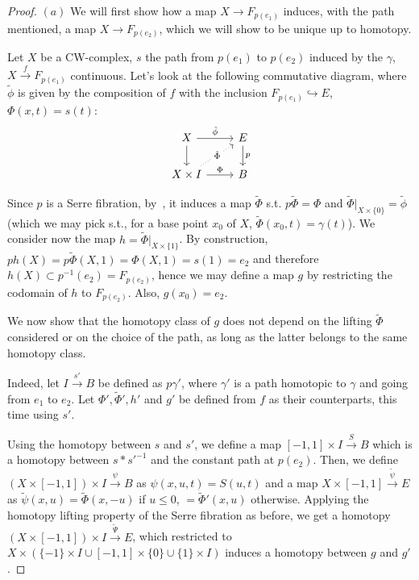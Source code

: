 \documentclass{article}
\begin{document}
\begin{proof}
    $(a)$ We will first show how a map $X\rightarrow F_{p(e_1)}$ induces, with
    the path mentioned, a map $X\rightarrow F_{p(e_2)}$, which we will show to
    be unique up to homotopy.

    Let $X$ be a CW-complex, $s$ the path from $p(e_1)$ to $p(e_2)$ induced
    by the $\gamma$, $X\xrightarrow{f} F_{p(e_1)}$ continuous. Let's look at the
    following commutative diagram, where $\tilde{\phi}$ is given by the
    composition of $f$ with the inclusion $F_{p(e_1)}\hookrightarrow E$, 
    $\Phi(x,t)=s(t)$:
    \[
        \begin{tikzcd}
            X\arrow{r}{\tilde{\phi}}\arrow{d}
            & E\arrow{d}{p} \\
            X\times I\arrow[dotted]{ur}[description]{\tilde{\Phi}}\arrow{r}{\Phi}
            & B
        \end{tikzcd}
    \]

    Since $p$ is a Serre fibration, by~\cite[p. 107, p.110]{FF16}, it induces a
    map $\tilde{\Phi}$ s.t. $p\tilde{\Phi}=\Phi$ and
    $\tilde{\Phi}|_{X\times\{0\}}=\tilde{\phi}$ (which we may pick s.t., for a
    base point $x_0$ of $X$, $\tilde{\Phi}(x_0,t)=\gamma(t)$). We consider now
    the map $h=\tilde{\Phi}|_{X\times\{1\}}$. By construction,
    $ph(X)=p\tilde{\Phi}(X,1)=\Phi(X,1)=s(1)=e_2$ and therefore $h(X)\subset
    p^{-1}(e_2)=F_{p(e_2)}$, hence we may define a map $g$ by restricting the
    codomain of $h$ to $F_{p(e_2)}$. Also, $g(x_0)=e_2$.

    We now show that the homotopy class of $g$ does not depend on the lifting
    $\tilde{\Phi}$ considered or on the choice of the path, as long as the
    latter belongs to the same homotopy class.

    Indeed, let $I\xrightarrow{s'}B$ be defined as $p\gamma'$, where $\gamma'$
    is a path homotopic to $\gamma$ and going from $e_1$ to $e_2$. Let $\Phi',
    \tilde{\Phi}',h'$ and $g'$ be defined from $f$ as their counterparts, this
    time using $s'$.

    Using the homotopy between $s$ and $s'$, we define a map $[-1,1]\times
    I\xrightarrow{S}B$ which is a homotopy between $s*s'^{-1}$ and the constant
    path at $p(e_2)$. Then, we define $(X\times[-1,1])\times I\xrightarrow{\psi}
    B$ as $\psi(x,u,t)=S(u,t)$ and a map
    $X\times[-1,1]\xrightarrow{\tilde{\psi}}E$ as
    $\tilde{\psi}(x,u)=\tilde{\Phi}(x,-u)$ if $u\leq0$, $=\tilde{\Phi}'(x,u)$
    otherwise. Applying the homotopy lifting property of the Serre fibration as
    before, we get a homotopy $(X\times[-1,1])\times
    I\xrightarrow{\tilde{\Psi}}E$, which restricted to $X\times(\{-1\}\times
    I\cup [-1,1]\times\{0\}\cup\{1\}\times I)$ induces a homotopy between $g$
    and $g'$.


\end{proof}
\end{document}
